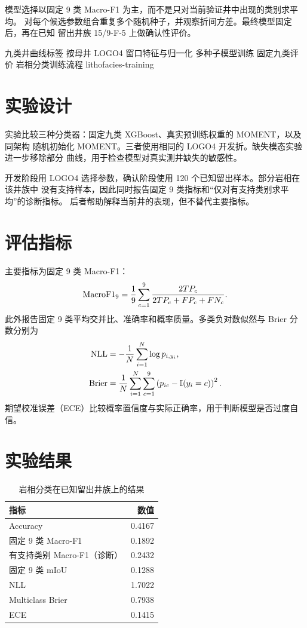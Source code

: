 模型选择以固定 9 类 Macro-F1 为主，而不是只对当前验证井中出现的类别求平均。
对每个候选参数组合重复多个随机种子，并观察折间方差。最终模型固定后，再在已知
留出井族 15/9-F-5 上做确认性评价。

\TrainingFlow
  {九类井曲线标签}
  {按母井 LOGO4}
  {窗口特征与归一化}
  {多种子模型训练}
  {固定九类评价}
  {岩相分类训练流程}
  {lithofacies-training}

\section{实验设计}

实验比较三种分类器：固定九类 XGBoost、真实预训练权重的 MOMENT，以及同架构
随机初始化 MOMENT。三者使用相同的 LOGO4 开发折。缺失模态实验进一步移除部分
曲线，用于检查模型对真实测井缺失的敏感性。

开发阶段用 LOGO4 选择参数，确认阶段使用 120 个已知留出样本。部分岩相在该井族中
没有支持样本，因此同时报告固定 9 类指标和“仅对有支持类别求平均”的诊断指标。
后者帮助解释当前井的表现，但不替代主要指标。

\section{评估指标}

主要指标为固定 9 类 Macro-F1：
\begin{equation}
  \mathrm{MacroF1}_{9}
  =\frac{1}{9}\sum_{c=1}^{9}
  \frac{2TP_c}{2TP_c+FP_c+FN_c}.
\end{equation}
此外报告固定 9 类平均交并比、准确率和概率质量。多类负对数似然与 Brier 分数分别为
\begin{align}
  \mathrm{NLL} &=-\frac{1}{N}\sum_{i=1}^{N}\log p_{i,y_i},\\
  \mathrm{Brier} &=\frac{1}{N}\sum_{i=1}^{N}
  \sum_{c=1}^{9}\left(p_{ic}-\mathbb{I}(y_i=c)\right)^2.
\end{align}
期望校准误差（ECE）比较概率置信度与实际正确率，用于判断模型是否过度自信。

\section{实验结果}

\begin{table}[htbp]
  \centering
  \caption{岩相分类在已知留出井族上的结果}
  \label{tab:litho-holdout}
  \begin{tabular}{lr}
    \toprule
    指标 & 数值 \\
    \midrule
    Accuracy & 0.4167 \\
    固定 9 类 Macro-F1 & 0.1892 \\
    有支持类别 Macro-F1（诊断） & 0.2432 \\
    固定 9 类 mIoU & 0.1288 \\
    NLL & 1.7022 \\
    Multiclass Brier & 0.7938 \\
    ECE & 0.1415 \\
    \bottomrule
  \end{tabular}
\end{table}

